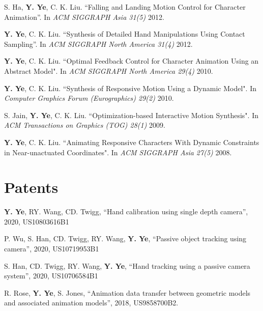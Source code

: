 \documentclass[margin,line]{res}
\begin{document}
\begin{resume}
\vspace*{-.1in}
S. Ha, {\bf Y. Ye}, C. K. Liu. ``Falling and Landing Motion Control for Character Animation''. In {\em ACM SIGGRAPH Asia 31(5)} 2012.

\vspace*{-.1in}
{\bf Y. Ye}, C. K. Liu. ``Synthesis of Detailed Hand Manipulations Using Contact Sampling''. In {\em ACM SIGGRAPH North America 31(4)} 2012.

\vspace*{-.1in}
{\bf Y. Ye}, C. K. Liu. ``Optimal Feedback Control for Character Animation Using an Abstract Model". In {\em ACM SIGGRAPH North America 29(4)} 2010.

\vspace*{-.1in}
{\bf Y. Ye}, C. K. Liu. ``Synthesis of Responsive Motion Using a Dynamic Model". In {\em Computer Graphics Forum (Eurographics) 29(2)} 2010.

\vspace*{-.1in}
S. Jain, {\bf Y. Ye}, C. K. Liu. ``Optimization-based Interactive Motion Synthesis". In {\em ACM Transactions on Graphics (TOG) 28(1)} 2009. 

\vspace*{-.1in}
{\bf Y. Ye}, C. K. Liu. ``Animating Responsive Characters With Dynamic Constraints in Near-unactuated Coordinates".  In {\em ACM SIGGRAPH Asia 27(5)} 2008.



\section{\sc Patents}

{\bf Y. Ye},  RY. Wang, CD. Twigg, ``Hand calibration using single depth camera'', 2020, US10803616B1

\vspace*{-.1in}
P. Wu, S. Han, CD. Twigg, RY. Wang, {\bf Y. Ye}, ``Passive object tracking using camera'', 2020, US10719953B1

\vspace*{-.1in}
S. Han, CD. Twigg, RY. Wang, {\bf Y. Ye}, ``Hand tracking using a passive camera system'', 2020, US10706584B1

\vspace*{-.1in}
R. Rose, {\bf Y. Ye}, S. Jones, ``Animation data transfer between geometric models and associated animation models'', 2018, US9858700B2. 


\end{resume}
\end{document}
